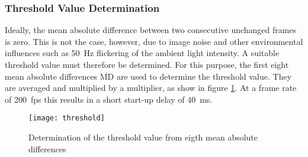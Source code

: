 \subsubsection{Threshold Value Determination}
\label{subsubsec:threshold}

Ideally, the mean absolute difference between two consecutive unchanged frames is zero.
This is not the case, however, due to image noise and other environmental influences such as \SI{50}{Hz} flickering of the ambient light intensity.
A suitable threshold value must therefore be determined.
For this purpose, the first eight mean absolute differences $\overline{\text{MD}}$ are used to determine the threshold value.
They are averaged and multiplied by a multiplier, as show in figure \ref{fig:threshold}.
At a frame rate of \SI{200}{fps} this results in a short start-up delay of \SI{40}{ms}.

\begin{figure}[h]
  \centering
  \texttt{[image: threshold]}
  \caption{Determination of the threshold value from eigth mean absolute differences}
  \label{fig:threshold}
\end{figure}
